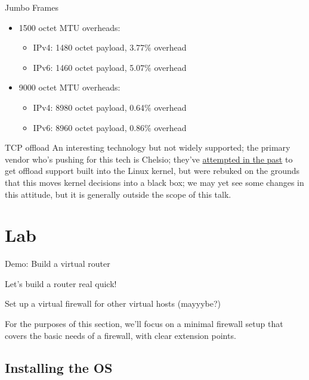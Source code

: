 \documentclass[bigger,aspectratio=169]{beamer}
\begin{document}
\begin{frame}{Jumbo Frames}
  \begin{itemize}
  \item 1500 octet MTU overheads:
    \begin{itemize}
    \item IPv4: 1480 octet payload, 3.77\% overhead
    \item IPv6: 1460 octet payload, 5.07\% overhead
    \end{itemize}
  \item 9000 octet MTU overheads:
    \begin{itemize}
    \item IPv4: 8980 octet payload, 0.64\% overhead
    \item IPv6: 8960 octet payload, 0.86\% overhead
    \end{itemize}
  \end{itemize}
\end{frame}

\begin{frame}[label={sec:orgc8262cc}]{TCP offload}
An interesting technology but not widely supported; the primary vendor who's
pushing for this tech is Chelsio; they've \href{https://lwn.net/Articles/148697/}{attempted in the past} to get offload
support built into the Linux kernel, but were rebuked on the grounds that this
moves kernel decisions into a black box; we may yet see some changes in this
attitude, but it is generally outside the scope of this talk.
\end{frame}

\section{Lab}
\label{sec:org475924a}
\begin{frame}{Demo: Build a virtual router}
  
Let's build a router real quick!

Set up a virtual firewall for other virtual hosts (mayyybe?)

For the purposes of this section, we'll focus on a minimal firewall setup that
covers the basic needs of a firewall, with clear extension points.
\end{frame}

\subsection{Installing the OS}
\label{sec:org4390e2a}
\end{document}
